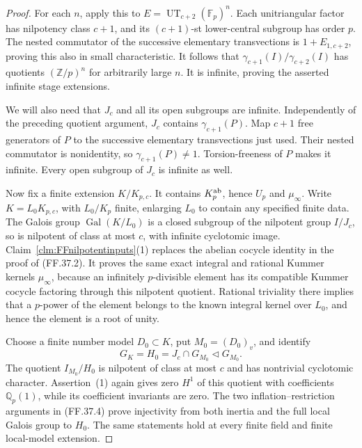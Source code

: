 \begin{proof}
For each \(n\), apply this to
\(E=\operatorname{UT}_{c+2}(\mathbb F_p)^n\).
Each unitriangular factor has
nilpotency class \(c+1\), and
its \((c+1)\)-st lower-central
subgroup has order \(p\).
The nested commutator of the
successive elementary transvections
is \(1+E_{1,c+2}\), proving this
also in small characteristic.
It follows that
\(\gamma_{c+1}(I)/\gamma_{c+2}(I)\)
has quotients \((\mathbb Z/p)^n\)
for arbitrarily large \(n\).
It is infinite, proving the
asserted infinite stage extensions.

We will also need that \(J_c\)
and all its open subgroups are
infinite. Independently of the
preceding quotient argument,
\(J_c\) contains \(\gamma_{c+1}(P)\).
Map \(c+1\) free generators of
\(P\) to the successive elementary
transvections just used. Their
nested commutator is nonidentity,
so \(\gamma_{c+1}(P)\ne1\).
Torsion-freeness of \(P\) makes
it infinite. Every open subgroup
of \(J_c\) is infinite as well.

Now fix a finite extension
\(K/K_{p,c}\). It contains
\(K_p^{\rm ab}\), hence
\(U_p\) and \(\mu_\infty\).
Write \(K=L_0K_{p,c}\), with
\(L_0/K_p\) finite, enlarging
\(L_0\) to contain any specified
finite data. The Galois group
\(\operatorname{Gal}(K/L_0)\)
is a closed subgroup of the
nilpotent group \(I/J_c\),
so is nilpotent of class at most
\(c\), with infinite cyclotomic
image. Claim~\ref{clm:FFnilpotentinputs}(1)
replaces the abelian cocycle identity
in the proof of (FF.37.2).
It proves the same exact integral
and rational Kummer kernels
\(\mu_\infty\), because an
infinitely \(p\)-divisible element
has its compatible Kummer cocycle
factoring through this nilpotent
quotient. Rational triviality there
implies that a \(p\)-power of
the element belongs to the known
integral kernel over \(L_0\),
and hence the element is a
root of unity.

Choose a finite number model
\(D_0\subset K\), put
\(M_0=(D_0)_v\), and identify
\[
        G_K=H_0=J_c\cap G_{M_0}
                         \triangleleft G_{M_0}.
                                                        \tag{FF.39.3}
\]
The quotient \(I_{M_0}/H_0\)
is nilpotent of class at most
\(c\) and has nontrivial
cyclotomic character. Assertion~(1)
again gives zero \(H^1\) of this
quotient with coefficients
\(\mathbb Q_p(1)\), while its
coefficient invariants are zero.
The two inflation--restriction
arguments in (FF.37.4) prove
injectivity from both inertia
and the full local Galois group
to \(H_0\). The same statements
hold at every finite field and
finite local-model extension.


\end{proof}
